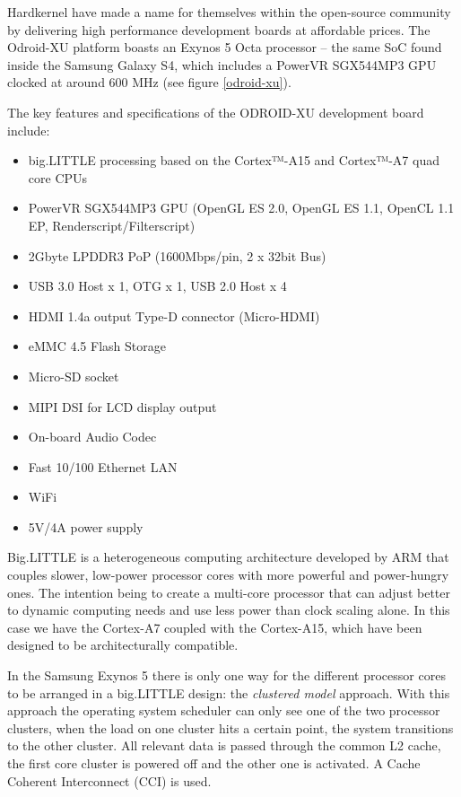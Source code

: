Hardkernel have made a name for themselves within the open-source community by delivering high performance development boards at affordable prices. The Odroid-XU platform boasts an Exynos 5 Octa processor – the same SoC found inside the Samsung Galaxy S4, which includes a PowerVR SGX544MP3 GPU clocked at around 600 MHz (see figure \ref{odroid-xu}).

The key features and specifications of the ODROID-XU development board include:
\begin{itemize}
\item big.LITTLE processing based on the Cortex™-A15 and Cortex™-A7 quad core CPUs
\item PowerVR SGX544MP3 GPU (OpenGL ES 2.0, OpenGL ES 1.1, OpenCL 1.1 EP, Renderscript/Filterscript)
\item 2Gbyte LPDDR3 PoP (1600Mbps/pin, 2 x 32bit Bus)
\item USB 3.0 Host x 1, OTG x 1, USB 2.0 Host x 4
\item HDMI 1.4a output Type-D connector (Micro-HDMI)
\item eMMC 4.5 Flash Storage
\item Micro-SD socket
\item MIPI DSI for LCD display output
\item On-board Audio Codec
\item Fast 10/100 Ethernet LAN
\item WiFi
\item 5V/4A power supply
\end{itemize}

Big.LITTLE is a heterogeneous computing architecture developed by ARM that couples slower, low-power processor cores with more powerful and power-hungry ones. The intention being to create a multi-core processor that can adjust better to dynamic computing needs and use less power than clock scaling alone. In this case we have the Cortex-A7 coupled with the Cortex-A15, which have been designed to be architecturally compatible.

In the Samsung Exynos 5 there is only one way for the different processor cores to be arranged in a big.LITTLE design: the \textit{clustered model} approach. With this approach the operating system scheduler can only see one of the two processor clusters, when the load on one cluster hits a certain point, the system transitions to the other cluster. All relevant data is passed through the common L2 cache, the first core cluster is powered off and the other one is activated. A Cache Coherent Interconnect (CCI) is used.


